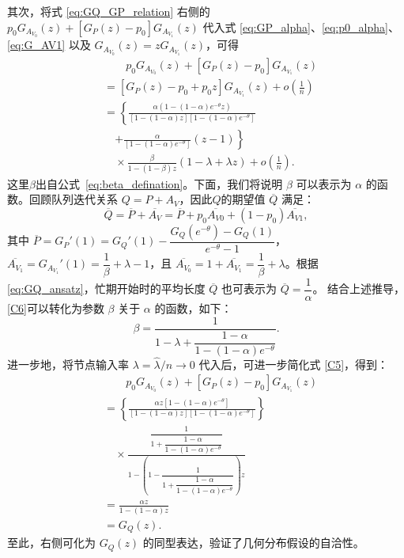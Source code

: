 其次，将式 \eqref{eq:GQ_GP_relation} 右侧的 $p_0 G_{A_{V_0}}(z) + [G_P(z) - p_0] G_{A_{V_1}}(z)$ 代入式 \eqref{eq:GP_alpha}、\eqref{eq:p0_alpha}、\eqref{eq:G_AV1} 以及 $G_{A_{V_0}}(z) = z G_{A_{V_1}}(z)$，可得
\begin{equation}\label{C5}
\begin{split}
&\qquad p_0 G_{A_{V_0}}(z) + \left[ G_{P}(z) - p_0 \right] G_{A_{V_1}}(z) \\
&= \left[ G_{P}(z) - p_0 + p_0 z \right] G_{A_{V_1}}(z) + o\left( \frac{1}{n} \right) \\
&= \left\{ \frac{\alpha \left( 1 - (1-\alpha) e^{-\theta} z \right)}{\left[ 1 - (1-\alpha) z \right] \left[ 1 - (1-\alpha) e^{-\theta} \right]} \right. \\
&\quad \left. + \frac{\alpha}{\left[ 1 - (1-\alpha) e^{-\theta} \right]} (z - 1) \right\} \\
&\quad \times \frac{\beta}{1 - (1-\beta) z} (1 - \lambda + \lambda z) + o\left( \frac{1}{n} \right).
\end{split}
\end{equation}
这里$\beta$出自公式~\eqref{eq:beta_defination}。下面，我们将说明 $\beta$ 可以表示为 $\alpha$ 的函数。回顾队列迭代关系 $Q=P+A_V$，因此$Q$的期望值 $\overline{Q}$ 满足：
\begin{equation}
\label{C6}
\overline{Q} = \overline{P} + \overline{A_{V}} = \overline{P} + p_0 \overline{A_{V0}} + (1 - p_0) \overline{A_{V1}},
\end{equation}
其中 $\overline{P} = G_{P}'(1) = G_{Q}'(1) - \dfrac{G_{Q}(e^{-\theta}) - G_{Q}(1)}{e^{-\theta} - 1}$，$\overline{A_{V_1}} = G_{A_{V_1}}'(1) = \dfrac{1}{\beta} + \lambda - 1$，且 $\overline{A_{V_0}} = 1 + \overline{A_{V_1}} = \dfrac{1}{\beta} + \lambda$。根据\eqref{eq:GQ_ansatz}，忙期开始时的平均长度 $\overline{Q}$ 也可表示为 $\overline{Q} = \dfrac{1}{\alpha}$。
结合上述推导，\eqref{C6}可以转化为参数 $\beta$ 关于 $\alpha$ 的函数，如下：
\begin{equation}\label{C7}
\beta = \frac{1}{1 - \lambda + \dfrac{1 - \alpha}{1 - (1-\alpha) e^{-\theta}}}.
\end{equation}
进一步地，将节点输入率 $\lambda = \hat{\lambda}/n \to 0$ 代入后，可进一步简化式 \eqref{C5}，得到：
\begin{equation}\label{C8}
\begin{split}
&\qquad p_0 G_{A_{V_0}}(z) + \left[ G_{P}(z) - p_0 \right] G_{A_{V_1}}(z) \\
&= \left\{ \frac{\alpha z \left[ 1 - (1-\alpha) e^{-\theta} \right]}{\left[ 1 - (1-\alpha) z \right] \left[ 1 - (1-\alpha) e^{-\theta} \right]} \right\} \\
&\quad \times \frac{\dfrac{1}{1 + \dfrac{1 - \alpha}{1 - (1-\alpha) e^{-\theta}}}}{1 - \left( 1 - \dfrac{1}{1 + \dfrac{1 - \alpha}{1 - (1-\alpha) e^{-\theta}}} \right) z} \\
&= \frac{\alpha z}{1 - (1-\alpha) z} \\
&= G_Q(z).
\end{split}
\end{equation}
至此，右侧可化为 $G_Q(z)$ 的同型表达，验证了几何分布假设的自洽性。

